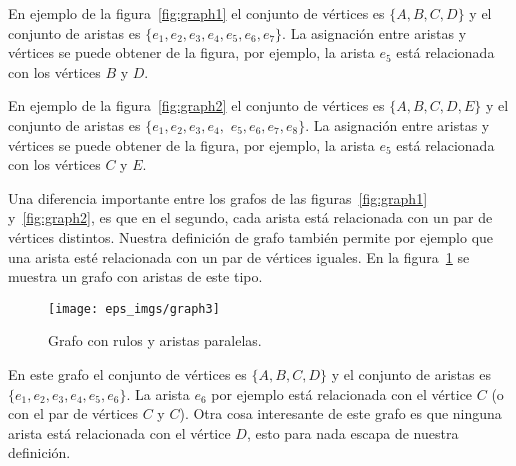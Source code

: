 \begin{ejemplo}
En ejemplo de la figura~\ref{fig:graph1} el conjunto de vértices es $\{A,B,C,D\}$ y el conjunto de aristas es $\{e_1,e_2,e_3,e_4,e_5,e_6,e_7\}$.
La asignación entre aristas y vértices se puede obtener de la figura, por ejemplo, la arista $e_5$ está relacionada con los vértices $B$ y $D$.

En ejemplo de la figura~\ref{fig:graph2} el conjunto de vértices es $\{A,B,C,D,E\}$ y el conjunto de aristas es $\{e_1,e_2,e_3,e_4,$ $e_5,e_6,e_7,e_8\}$.
La asignación entre aristas y vértices se puede obtener de la figura, por ejemplo, la arista $e_5$ está relacionada con los vértices $C$ y $E$.

Una diferencia importante entre los grafos de las figuras~\ref{fig:graph1} y~\ref{fig:graph2}, es que en el segundo, cada arista está relacionada con un par de vértices distintos.
Nuestra definición de grafo también permite por ejemplo que una arista esté relacionada con un par de vértices iguales.
En la figura~\ref{fig:graph3} se muestra un grafo con aristas de este tipo.
\begin{figure}[h!]
\centering
\texttt{[image: eps\_imgs/graph3]}
\caption{Grafo con rulos y aristas paralelas.}
\label{fig:graph3}
\end{figure}
En este grafo el conjunto de vértices es $\{A,B,C,D\}$ y el conjunto de aristas es $\{e_1,e_2,e_3,e_4,e_5,e_6\}$. 
La arista $e_6$ por ejemplo está relacionada con el vértice $C$ (o con el par de vértices $C$ y $C$).
Otra cosa interesante de este grafo es que ninguna arista está relacionada con el vértice $D$, esto para nada escapa de nuestra definición. 
\end{ejemplo}

